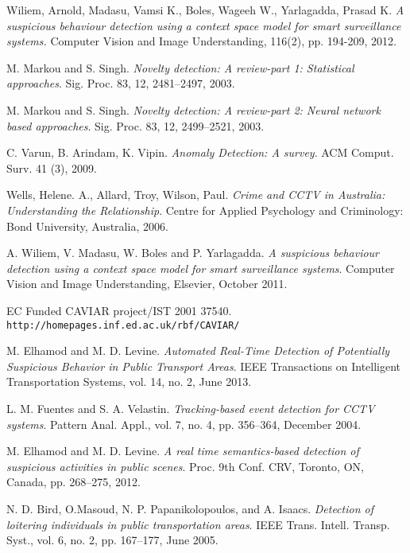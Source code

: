 \begin{thebibliography}{20}

Wiliem, Arnold, Madasu, Vamsi K., Boles, Wageeh W., Yarlagadda, Prasad K.
\textit{A suspicious behaviour detection using a context space model for smart surveillance systems.} 
Computer Vision and Image Understanding, 116(2), pp. 194-209, 2012.

M. Markou and S. Singh.
\textit{Novelty detection: A review-part 1: Statistical approaches}. 
Sig. Proc. 83, 12, 2481–2497, 2003.

M. Markou and S. Singh.
\textit{Novelty detection: A review-part 2: Neural network based approaches}. 
Sig. Proc. 83, 12, 2499–2521, 2003.

C. Varun, B. Arindam, K. Vipin.
\textit{Anomaly Detection: A survey}. 
ACM Comput. Surv. 41 (3), 2009.

Wells, Helene. A., Allard, Troy, Wilson, Paul.
\textit{Crime and CCTV in Australia: Understanding the Relationship}. 
Centre for Applied Psychology and Criminology: Bond University, Australia, 2006.

A. Wiliem, V. Madasu, W. Boles and P. Yarlagadda. 
\textit{A suspicious behaviour detection using a context space model for smart surveillance systems}. 
Computer Vision and Image Understanding, Elsevier, October 2011.

EC Funded CAVIAR project/IST 2001 37540.
\\\texttt{http://homepages.inf.ed.ac.uk/rbf/CAVIAR/}
 
M. Elhamod and M. D. Levine.
\textit{Automated Real-Time Detection of Potentially Suspicious Behavior in Public Transport Areas}. 
IEEE Transactions on Intelligent Transportation Systems, vol. 14, no. 2, June 2013.

L. M. Fuentes and S. A. Velastin.
\textit{Tracking-based event detection for CCTV systems}. 
Pattern Anal. Appl., vol. 7, no. 4, pp. 356–364, December 2004.

M. Elhamod and M. D. Levine.
\textit{A real time semantics-based detection of suspicious activities in public scenes}. 
Proc. 9th Conf. CRV, Toronto, ON, Canada, pp. 268–275, 2012.

N. D. Bird, O.Masoud, N. P. Papanikolopoulos, and A. Isaacs.
\textit{Detection of loitering individuals in public transportation areas}. 
IEEE Trans. Intell. Transp. Syst., vol. 6, no. 2, pp. 167–177, June 2005.


\end{thebibliography}

